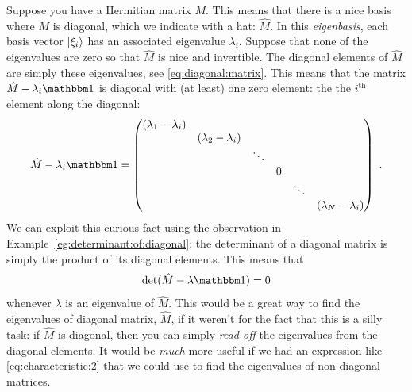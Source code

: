 \documentclass[12pt]{article}
\begin{document}
Suppose you have a Hermitian matrix $M$. This means that there is a nice basis where $M$ is diagonal, which we indicate with a hat: $\hat M$. In this \emph{eigenbasis}, each basis vector $\left|\xi_i\right\rangle$ has an associated eigenvalue $\lambda_i$. Suppose that none of the eigenvalues are zero so that $\hat M$ is nice and invertible. The diagonal elements of $\hat M$ are simply these eigenvalues, see \eqref{eq:diagonal:matrix}. This means that the matrix $\hat M - \lambda_i \one$ is diagonal with (at least) one zero element: the the $i^\text{th}$ element along the diagonal:
\begin{align}
\hat M -\lambda_i\one = 
    \begin{pmatrix}
        (\lambda_1 - \lambda_i) & & & && \\
         & (\lambda_2 - \lambda_i) & & && \\
         & & \ddots &&& \\
         & & & 0 & & \\
         & & && \ddots & \\
         & & &&& (\lambda_N-\lambda_i)
    \end{pmatrix} \ .
    \label{eq:characteristic:1}
\end{align} 
We can exploit this curious fact using the observation in Example~\ref{eg:determinant:of:diagonal}: the determinant of a diagonal matrix is simply the product of its diagonal elements. This means that
\begin{align}
     \det(\hat M - \lambda \one) = 0
     \label{eq:characteristic:2}
\end{align}
whenever $\lambda$ is an eigenvalue of $\hat M$. This would be a great way to find the eigenvalues of diagonal matrix, $\hat M$, if it weren't for the fact that this is a silly task: if $\hat M$ is diagonal, then you can simply \emph{read off} the eigenvalues from the diagonal elements. It would be \emph{much} more useful if we had an expression like \eqref{eq:characteristic:2} that we could use to find the eigenvalues of non-diagonal matrices.  
\end{document}
